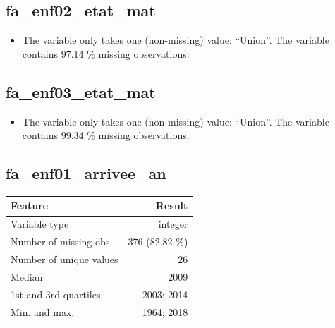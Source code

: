 \documentclass[
  letterpaper,
  DIV=11,
  numbers=noendperiod]{scrartcl}
\providecommand{\tightlist}{%
  \setlength{\itemsep}{0pt}\setlength{\parskip}{0pt}}
\begin{document}
\subsection{fa\_enf02\_etat\_mat}\label{fa_enf02_etat_mat}

\begin{itemize}
\tightlist
\item
  The variable only takes one (non-missing) value: ``Union''. The
  variable contains 97.14 \% missing observations.
\end{itemize}

\fullline

\subsection{fa\_enf03\_etat\_mat}\label{fa_enf03_etat_mat}

\begin{itemize}
\tightlist
\item
  The variable only takes one (non-missing) value: ``Union''. The
  variable contains 99.34 \% missing observations.
\end{itemize}

\fullline

\subsection{fa\_enf01\_arrivee\_an}\label{fa_enf01_arrivee_an}

\bminione

\begin{longtable}[]{@{}lr@{}}
\toprule\noalign{}
Feature & Result \\
\midrule\noalign{}
\endhead
\bottomrule\noalign{}
\endlastfoot
Variable type & integer \\
Number of missing obs. & 376 (82.82 \%) \\
Number of unique values & 26 \\
Median & 2009 \\
1st and 3rd quartiles & 2003; 2014 \\
Min. and max. & 1964; 2018 \\
\end{longtable}

\emini
\bminitwo
\end{document}
